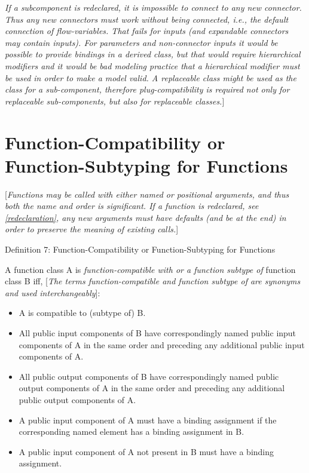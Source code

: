 \documentclass[10pt,a4paper]{report}
\def\doublelabel#1{\label{#1}\hypertarget{#1}{}}
\begin{document}
\emph{If a subcomponent is redeclared, it is impossible to connect to
any new connector. Thus any new connectors must work without being
connected, i.e., the default connection of flow-variables. That fails
for inputs (and expandable connectors may contain inputs). For
parameters and non-connector inputs it would be possible to provide
bindings in a derived class, but that would require hierarchical
modifiers and it would be bad modeling practice that a hierarchical
modifier must be used in order to make a model valid. A replaceable
class might be used as the class for a sub-component, therefore
plug-compatibility is required not only for replaceable sub-components,
but also for replaceable classes.}{]}

\section{Function-Compatibility or Function-Subtyping for Functions}\doublelabel{function-compatibility-or-function-subtyping-for-functions}

{[}\emph{Functions may be called with either named or positional
arguments, and thus both the name and order is significant. If a
function is redeclared, see \ref{redeclaration}, any new arguments must
have defaults (and be at the end) in order to preserve the meaning of
existing calls.}{]}

Definition 7: Function-Compatibility or Function-Subtyping for Functions

A function class A is \emph{function-compatible with or a function
subtype of} function class B iff, {[}\emph{The terms function-compatible
and function subtype of are synonyms and used interchangeably}{]}:

\begin{itemize}
\item
  A is compatible to (subtype of) B.
\item
  All public input components of B have correspondingly named public
  input components of A in the same order and preceding any additional
  public input components of A.
\item
  All public output components of B have correspondingly named public
  output components of A in the same order and preceding any additional
  public output components of A.
\item
  A public input component of A must have a binding assignment if the
  corresponding named element has a binding assignment in B.
\item
  A public input component of A not present in B must have a binding
  assignment.
\end{itemize}
\end{document}
